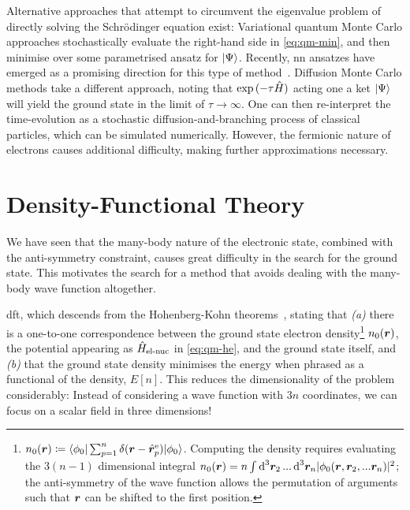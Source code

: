 Alternative approaches that attempt to circumvent the eigenvalue problem of directly solving the Schrödinger equation exist:
Variational quantum Monte Carlo approaches stochastically evaluate the right-hand side in \cref{eq:qm-min}, and then minimise over some parametrised ansatz for $\ket{\Psi}$. Recently, \gls{nn} ansatzes have emerged as a promising direction for this type of method~\cite{hscn2022a}.
Diffusion Monte Carlo methods take a different approach, noting that $\exp{(-\tau \hat H)}$ acting one a ket $\ket{\Psi}$ will yield the ground state in the limit of $\tau \rightarrow \infty$. One can then re-interpret the time-evolution as a stochastic diffusion-and-branching process of classical particles, which can be simulated numerically. However, the fermionic nature of electrons causes additional difficulty, making further approximations necessary.

\section{Density-Functional Theory}

We have seen that the many-body nature of the electronic state, combined with the anti-symmetry constraint, causes great difficulty in the search for the ground state. This motivates the search for a method that avoids dealing with the many-body wave function altogether.

 \gls{dft}, which descends from the Hohenberg-Kohn theorems~\cite{hk1964p}, stating that \emph{(a)} there is a one-to-one correspondence between the ground state electron density\footnote{
	$n_0(\boldsymbol{r}) \coloneqq \braket{\phi_0 | \sum_{p=1}^n\nolimits \delta(\boldsymbol{r} - \hat{\boldsymbol{r}}^{\text{e}}_p) | \phi_0}$.
	Computing the density requires evaluating the $3(n-1)$ dimensional integral
	$n_0(\boldsymbol{r}) = n \int_{} \, \text{d}^3\boldsymbol{r}_2\, ...\, \text{d}^3 \boldsymbol{r}_n |\phi_0(\boldsymbol{r}, \boldsymbol{r}_2, ... \boldsymbol{r}_n)|^2$;
	the anti-symmetry of the wave function allows the permutation of arguments such that $\boldsymbol{r}$ can be shifted to the first position.
} $n_0(\boldsymbol{r})$, the  potential appearing as $ \hat H_{\text{el-nuc}}$ in \cref{eq:qm-he}, and the ground state itself, and \emph{(b)} that the ground state density minimises the energy when phrased as a functional of the density, $E[n]$.
This reduces the dimensionality of the problem considerably: Instead of considering a wave function with $3n$ coordinates, we can focus on a scalar field in three dimensions!

